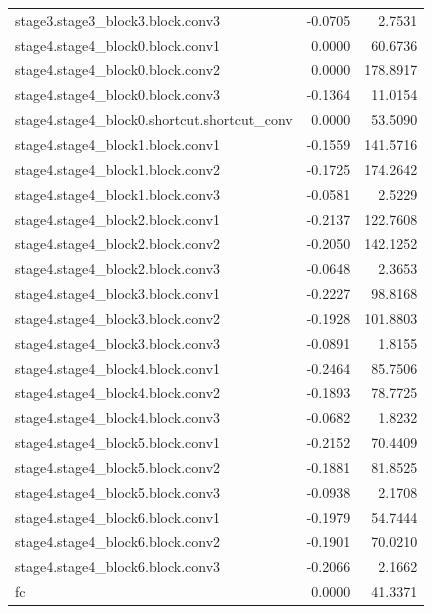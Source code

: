\begin{longtable}{lrr}
stage3.stage3_block3.block.conv3 & -0.0705 & 2.7531 \\
stage4.stage4_block0.block.conv1 & 0.0000 & 60.6736 \\
stage4.stage4_block0.block.conv2 & 0.0000 & 178.8917 \\
stage4.stage4_block0.block.conv3 & -0.1364 & 11.0154 \\
stage4.stage4_block0.shortcut.shortcut_conv & 0.0000 & 53.5090 \\
stage4.stage4_block1.block.conv1 & -0.1559 & 141.5716 \\
stage4.stage4_block1.block.conv2 & -0.1725 & 174.2642 \\
stage4.stage4_block1.block.conv3 & -0.0581 & 2.5229 \\
stage4.stage4_block2.block.conv1 & -0.2137 & 122.7608 \\
stage4.stage4_block2.block.conv2 & -0.2050 & 142.1252 \\
stage4.stage4_block2.block.conv3 & -0.0648 & 2.3653 \\
stage4.stage4_block3.block.conv1 & -0.2227 & 98.8168 \\
stage4.stage4_block3.block.conv2 & -0.1928 & 101.8803 \\
stage4.stage4_block3.block.conv3 & -0.0891 & 1.8155 \\
stage4.stage4_block4.block.conv1 & -0.2464 & 85.7506 \\
stage4.stage4_block4.block.conv2 & -0.1893 & 78.7725 \\
stage4.stage4_block4.block.conv3 & -0.0682 & 1.8232 \\
stage4.stage4_block5.block.conv1 & -0.2152 & 70.4409 \\
stage4.stage4_block5.block.conv2 & -0.1881 & 81.8525 \\
stage4.stage4_block5.block.conv3 & -0.0938 & 2.1708 \\
stage4.stage4_block6.block.conv1 & -0.1979 & 54.7444 \\
stage4.stage4_block6.block.conv2 & -0.1901 & 70.0210 \\
stage4.stage4_block6.block.conv3 & -0.2066 & 2.1662 \\
fc & 0.0000 & 41.3371 \\
\end{longtable}
